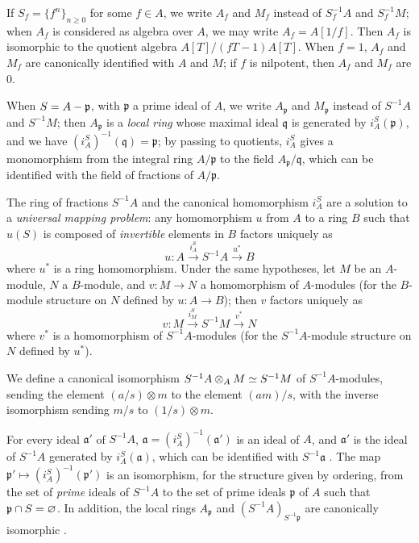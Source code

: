 \begin{env}[1.2.3]
\label{0.1.2.3}
If $S_f=\{f^n\}_{n\geq 0}$ for some $f\in A$, we write $A_f$ and $M_f$ instead
of $S_f^{-1}A$ and $S_f^{-1}M$; when $A_f$ is considered as algebra over $A$, we
may write $A_f=A[1/f]$. Then $A_f$ is isomorphic to the quotient algebra
$A[T]/(fT-1)A[T]$. When $f=1$, $A_f$ and $M_f$ are canonically identified with $A$ and
$M$; if $f$ is nilpotent, then $A_f$ and $M_f$ are $0$.

When $S=A-\mathfrak{p}$, with $\mathfrak{p}$ a prime ideal of $A$, we write
$A_\mathfrak{p}$ and $M_\mathfrak{p}$ instead of $S^{-1}A$ and $S^{-1}M$;
then $A_\mathfrak{p}$ is a \emph{local ring} whose maximal ideal $\mathfrak{q}$ is
generated by $i_A^S(\mathfrak{p})$, and we have
$(i_A^S)^{-1}(\mathfrak{q})=\mathfrak{p}$; by passing to quotients, $i_A^S$
gives a monomorphism from the integral ring $A/\mathfrak{p}$ to the field
$A_\mathfrak{p}/\mathfrak{q}$, which can be identified with the field of fractions of
$A/\mathfrak{p}$.
\end{env}

\begin{env}[1.2.4]
\label{0.1.2.4}
The ring of fractions $S^{-1}A$ and the canonical homomorphism $i_A^S$ are a
solution to a \emph{universal mapping problem}: any homomorphism $u$ from $A$ to
a ring $B$ such that $u(S)$ is composed of \emph{invertible} elements in $B$
factors uniquely as
\[
  u:A\xrightarrow{i_A^S}S^{-1}A\xrightarrow{u^*}B
\]
where
$u^*$ is a ring homomorphism.
Under the same hypotheses, let $M$ be an $A$-module, $N$ a $B$-module, and $v:M\to N$ a homomorphism of $A$-modules (for the $B$-module structure on $N$ defined by $u:A\to B$); then $v$ factors uniquely as
\[
  v:M\xrightarrow{i_M^S}S^{-1}M\xrightarrow{v^*}N
\]
where $v^*$ is a homomorphism of $S^{-1}A$-modules (for the $S^{-1}A$-module structure on $N$ defined by $u^*$).
\end{env}

\begin{env}[1.2.5]
\label{0.1.2.5}
We define a canonical isomorphism $S^{-1}A\otimes_A M\simeq S^{-1}M$ of $S^{-1}A$-modules, sending the element $(a/s)\otimes m$ to the element $(am)/s$, with the inverse isomorphism sending $m/s$ to $(1/s)\otimes m$.
\end{env}

\begin{env}[1.2.6]
\label{0.1.2.6}
For every ideal $\mathfrak{a}'$ of $S^{-1}A$, $\mathfrak{a}=(i_A^S)^{-1}(\mathfrak{a}')$ is an ideal of $A$, and
$\mathfrak{a}'$ is the ideal of $S^{-1}A$ generated by $i_A^S(\mathfrak{a})$,
which can be identified with $S^{-1}\mathfrak{a}$ . The map
$\mathfrak{p}'\mapsto(i_A^S)^{-1}(\mathfrak{p}')$ is an isomorphism, for the structure given by ordering, from the set of \emph{prime} ideals of $S^{-1}A$ to the set of
prime ideals $\mathfrak{p}$ of $A$ such that $\mathfrak{p}\cap S=\varnothing$. In
addition, the local rings $A_\mathfrak{p}$ and $(S^{-1}A)_{S^{-1}\mathfrak{p}}$
are canonically isomorphic .
\end{env}

